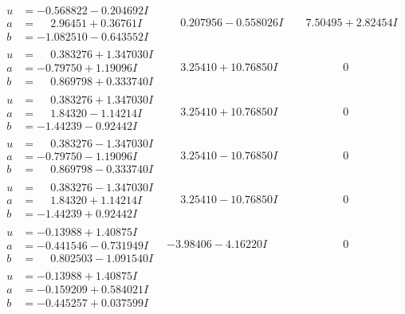 \documentclass[1p]{elsarticle_modified}
\theoremstyle{definition}
\begin{document}
$$\begin{array}{c|c|c}
\begin{aligned}
u &= -0.568822 - 0.204692 I \\
a &= \phantom{-}2.96451 + 0.36761 I \\
b &= -1.082510 - 0.643552 I\end{aligned}
 & \phantom{-}0.207956 - 0.558026 I & \phantom{-}7.50495 + 2.82454 I \\ \hline\begin{aligned}
u &= \phantom{-}0.383276 + 1.347030 I \\
a &= -0.79750 + 1.19096 I \\
b &= \phantom{-}0.869798 + 0.333740 I\end{aligned}
 & \phantom{-}3.25410 + 10.76850 I & \phantom{-0.000000 } 0 \\ \hline\begin{aligned}
u &= \phantom{-}0.383276 + 1.347030 I \\
a &= \phantom{-}1.84320 - 1.14214 I \\
b &= -1.44239 - 0.92442 I\end{aligned}
 & \phantom{-}3.25410 + 10.76850 I & \phantom{-0.000000 } 0 \\ \hline\begin{aligned}
u &= \phantom{-}0.383276 - 1.347030 I \\
a &= -0.79750 - 1.19096 I \\
b &= \phantom{-}0.869798 - 0.333740 I\end{aligned}
 & \phantom{-}3.25410 - 10.76850 I & \phantom{-0.000000 } 0 \\ \hline\begin{aligned}
u &= \phantom{-}0.383276 - 1.347030 I \\
a &= \phantom{-}1.84320 + 1.14214 I \\
b &= -1.44239 + 0.92442 I\end{aligned}
 & \phantom{-}3.25410 - 10.76850 I & \phantom{-0.000000 } 0 \\ \hline\begin{aligned}
u &= -0.13988 + 1.40875 I \\
a &= -0.441546 - 0.731949 I \\
b &= \phantom{-}0.802503 - 1.091540 I\end{aligned}
 & -3.98406 - 4.16220 I & \phantom{-0.000000 } 0 \\ \hline\begin{aligned}
u &= -0.13988 + 1.40875 I \\
a &= -0.159209 + 0.584021 I \\
b &= -0.445257 + 0.037599 I\end{aligned}

\end{array}$$
\end{document}
